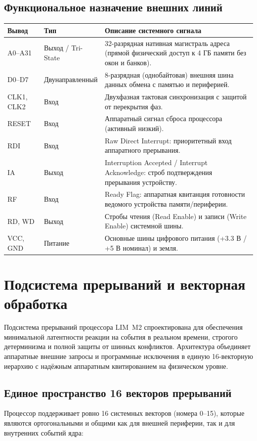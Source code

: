 \documentclass[11pt,a4paper]{article}
\begin{document}
\subsection{Функциональное назначение внешних линий}
\begin{tabularx}{\textwidth}{>{\ttfamily}p{28mm}p{24mm}X}
\toprule
Вывод & Тип & Описание системного сигнала \\
\midrule
A0--A31    & Выход / Tri-State & 32-разрядная нативная магистраль адреса (прямой физический доступ к 4 ГБ памяти без окон и банков). \\
D0--D7     & Двунаправленный   & 8-разрядная (однобайтовая) внешняя шина данных обмена с памятью и периферией. \\
CLK1, CLK2 & Вход              & Двухфазная тактовая синхронизация с защитой от перекрытия фаз. \\
RESET      & Вход              & Аппаратный сигнал сброса процессора (активный низкий). \\
RDI        & Вход              & Raw Direct Interrupt: приоритетный вход аппаратного прерывания. \\
IA         & Выход             & Interruption Accepted / Interrupt Acknowledge: строб подтверждения прерывания устройству. \\
RF         & Вход              & Ready Flag: аппаратная квитанция готовности ведомого устройства памяти/периферии. \\
RD, WD     & Выход             & Стробы чтения (Read Enable) и записи (Write Enable) системной шины. \\
VCC, GND   & Питание           & Основные шины цифрового питания (+3.3 В / +5 В номинал) и земля. \\
\bottomrule
\end{tabularx}

\clearpage
\section{Подсистема прерываний и векторная обработка}

Подсистема прерываний процессора LIM~M2 спроектирована для обеспечения минимальной латентности реакции на события в реальном времени, строгого детерминизма и полной защиты от шинных конфликтов. Архитектура объединяет аппаратные внешние запросы и программные исключения в единую 16-векторную иерархию с надёжным аппаратным квитированием на физическом уровне.

\subsection{Единое пространство 16 векторов прерываний}
Процессор поддерживает ровно 16 системных векторов (номера 0--15), которые являются ортогональными и общими как для внешней периферии, так и для внутренних событий ядра:
\end{document}
